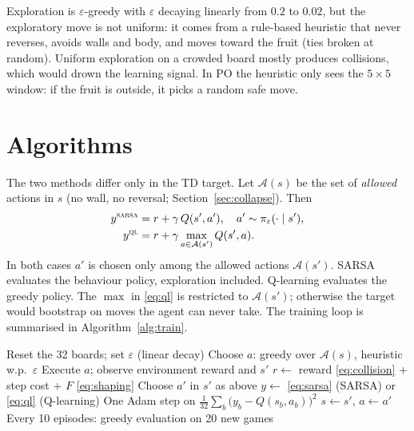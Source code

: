 \documentclass{article}
\begin{document}
Exploration is $\varepsilon$-greedy with $\varepsilon$ decaying linearly from $0.2$ to $0.02$, but the exploratory move is not uniform: it comes from a rule-based heuristic that never reverses, avoids walls and body, and moves toward the fruit (ties broken at random).
Uniform exploration on a crowded board mostly produces collisions, which would drown the learning signal.
In PO the heuristic only sees the $5\times5$ window: if the fruit is outside, it picks a random safe move.

\section{Algorithms}
\label{sec:algo}

The two methods differ only in the TD target.
Let $\mathcal{A}(s)$ be the set of \emph{allowed} actions in $s$ (no wall, no reversal; Section~\ref{sec:collapse}). Then
\begin{align}
y^{\textsc{sarsa}} &= r + \gamma\, Q(s',a'), \quad a' \sim \pi_\varepsilon(\cdot \mid s'), \label{eq:sarsa}\\
y^{\textsc{ql}} &= r + \gamma \max_{a \in \mathcal{A}(s')} Q(s',a). \label{eq:ql}
\end{align}
In both cases $a'$ is chosen only among the allowed actions $\mathcal{A}(s')$. SARSA evaluates the behaviour policy, exploration included. Q-learning evaluates the greedy policy.
The $\max$ in \eqref{eq:ql} is restricted to $\mathcal{A}(s')$; otherwise the target would bootstrap on moves the agent can never take.
The training loop is summarised in Algorithm~\ref{alg:train}.

\begin{algorithm}[tb]
   \caption{Training loop (shared by SARSA and Q-learning)}
   \label{alg:train}
\begin{algorithmic}
   \STATE Reset the 32 boards; set $\varepsilon$ (linear decay)
   \STATE Choose $a$: greedy over $\mathcal{A}(s)$, heuristic w.p.\ $\varepsilon$
   \STATE Execute $a$; observe environment reward and $s'$
   \STATE $r \leftarrow$ reward \eqref{eq:collision} $+$ step cost $+$ $F$ \eqref{eq:shaping}
   \STATE Choose $a'$ in $s'$ as above
   \STATE $y \leftarrow$ \eqref{eq:sarsa} (SARSA) or \eqref{eq:ql} (Q-learning)
   \STATE One Adam step on $\frac{1}{32}\sum_{b}\big(y_b - Q(s_b,a_b)\big)^2$
   \STATE $s \leftarrow s'$, $a \leftarrow a'$
   \ENDFOR
   \STATE Every 10 episodes: greedy evaluation on 20 new games
   \ENDFOR
\end{algorithmic}
\end{algorithm}
\end{document}
